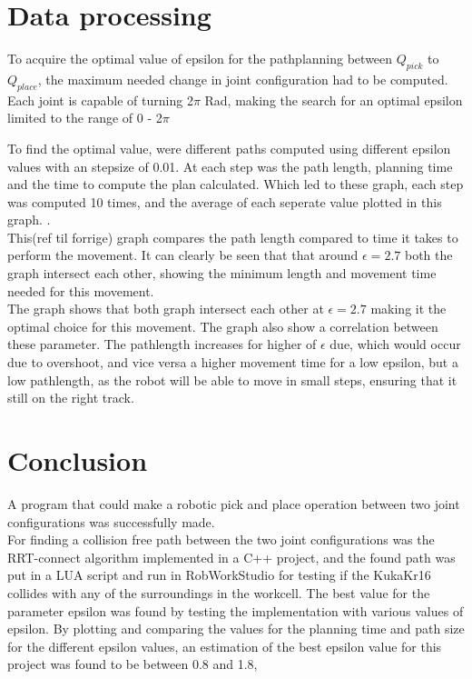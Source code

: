 \documentclass[11pt]{article}
\begin{document}
\section{Data processing}
To acquire the optimal value of epsilon for the pathplanning between $Q_{pick}$ to $Q_{place}$,  the maximum needed change in joint configuration had to be computed. Each joint is capable of turning 2$\pi$ Rad, making the search for an optimal epsilon limited to the range of 0 - 2$\pi$
 
 
\noindent To find the optimal value, were different paths computed using different epsilon values with an stepsize of 0.01.  At each step was the path length, planning time  and the time to compute the plan calculated.   Which led to these graph, each step was computed 10 times, and the average of each seperate value plotted in this graph. .\\[0.2cm]


\noindent This(ref til forrige) graph compares the path length compared to time it takes to perform the movement.  It can clearly be seen that  that around $\epsilon = 2.7$  both the graph intersect each other, showing the minimum length and movement time needed for this movement. 
\\

The graph shows that both graph intersect each other at $\epsilon = 2.7$ making it the optimal choice for this movement.  The graph also show a correlation between these parameter.  The pathlength increases for higher of $\epsilon$ due, which would occur due to overshoot, and vice versa a higher movement time for a low epsilon, but a low pathlength, as the robot will be able to move in small steps, ensuring that it still on the right track. 


\newpage
\section{Conclusion}
A program that could make a robotic pick and place operation between two joint configurations was successfully made.\\[0.2cm]


\noindent For finding a collision free path between the two joint configurations was the RRT-connect algorithm implemented in a C++ project, and the found path was put in a LUA script and run in RobWorkStudio for testing if the KukaKr16 collides with any of the surroundings in the workcell. The best value for the parameter epsilon was found by testing the implementation with various values of epsilon. By plotting and comparing the values for the planning time and path size for the different epsilon values, an estimation of the best epsilon value for this project was found to be between 0.8 and 1.8,
\end{document}
